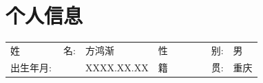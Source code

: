     \begin{figure}[h]
        \begin{minipage}{0.75\textwidth}
            \section{\makebox[\widthof{\faAddressCard}][cc]{\color{SWU_Blue}{\faAddressCard}}\quad 个人信息}
            \begin{tabularx}{\linewidth}{p{}Xp{}X}
                姓\ \ \ \ \ \ \ \ \ 名: & 方鸿渐 & 
                性\ \ \ \ \ \ \ \ \ 别: & 男  \\
                出生年月: & XXXX.XX.XX & 
                籍\ \ \ \ \ \ \ \ \ 贯: & 重庆  \\
            \end{tabularx}
        \end{minipage}
    \hspace{2em}
    \begin{minipage}{0.16\textwidth}
        \setlength{\fboxsep}{0pt}
    \end{minipage}
    \end{figure}
    \vspace{-1.5em}



